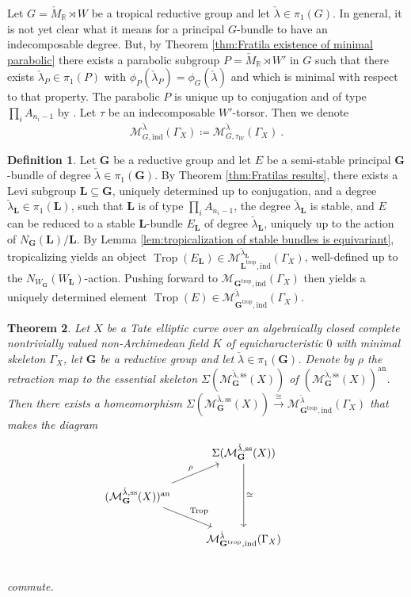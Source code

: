 \documentclass[10pt, a4paper]{amsart}
\newtheorem{theorem}{Theorem}[section]
\theoremstyle{definition}
\newtheorem{definition}[theorem]{Definition}
\theoremstyle{myitemstyle}
\newcommand{\R}{\mathbb{R}}
\newcommand{\Mcheck}{{\check{M}}}
\newcommand{\lambdacheck}{\check{\lambda}}
\newcommand{\bfG}{\mathbf{G}}
\newcommand{\mc}[1]{{\mathcal{#1}}}
\DeclareMathOperator{\Trop}{Trop}
\newcommand{\an}{\mathrm{an}}
\newcommand{\semist}{\mathrm{ss}}
\newcommand{\ind}{\mathrm{ind}}
\newcommand{\trop}{{\mathrm{trop}}}
\newcommand{\Ga}{\Gamma}
\begin{document}
Let $G= \Mcheck_\R \rtimes W$ be a tropical reductive group and let $\lambdacheck \in \pi_1(G)$. In general, it is not yet clear what it means for a principal $G$-bundle to have an indecomposable degree. But, by Theorem \ref{thm:Fratila existence of minimal parabolic} there exists a parabolic subgroup $P=\Mcheck_\R \rtimes W'$ in $G$ such that there exists $\lambdacheck_P\in \pi_1(P)$ with $\phi_P(\lambdacheck_P)=\phi_G(\lambdacheck)$ and which is minimal with respect to that property. The parabolic $P$ is unique up to conjugation and of type $\prod_i A_{n_i-1}$ by \cite[Cor. 4.2]{fratila2016stack}. Let $\tau$ be an indecomposable $W'$-torsor. Then we denote 
\[
    \mc M_{G,\ind}^{\lambdacheck}(\Ga_X)\coloneqq\mc M_{G,\tau_W}^{ \lambdacheck}(\Ga_X) \ .
\]


\begin{definition}
Let $\mathbf{G}$ be a reductive group and let $E$ be a semi-stable principal $\mathbf{G}$-bundle of degree $\lambdacheck \in \pi_1(\bfG)$. By Theorem \ref{thm:Fratilas results}, there exists a Levi subgroup $\mathbf{L} \subseteq \mathbf{G}$, uniquely determined up to conjugation, and a degree $\lambdacheck_\mathbf{L}\in \pi_1(\mathbf{L})$, such that $\mathbf{L}$ is of type $\prod_i A_{n_i-1}$, the degree $\lambdacheck_\mathbf{L}$ is stable, and $E$ can be reduced to a stable $\mathbf{L}$-bundle $E_\mathbf{L}$ of degree $\lambdacheck_\mathbf{L}$, uniquely up to the action of $N_\mathbf{G}(\mathbf{L})/\mathbf{L}$. By Lemma \ref{lem:tropicalization of stable bundles is equivariant}, tropicalizing yields an object $\Trop(E_\mathbf{L})\in \mc M_{\mathbf{L}^\trop,\ind}^{\lambdacheck_\mathbf{L}}(\Ga_X)$, well-defined up to the $N_{W_\mathbf{G}}(W_\mathbf{L})$-action. Pushing forward to $\mc M_{\mathbf{G}^\trop,\ind}(\Ga_X)$ then yields a uniquely determined element $\Trop(E)\in \mc M_{\mathbf{G}^\trop, \ind}^{\lambdacheck}(\Ga_X)$.
\end{definition}


\begin{theorem} 
\label{thm:tropical semistable bundles skeleton of semistable bundles}
Let $X$ be a Tate elliptic curve over an algebraically closed complete nontrivially valued non-Archimedean field $K$ of equicharacteristic $0$ with minimal skeleton $\Gamma_X$, let $\mathbf{G}$ be a reductive group and let $\lambdacheck\in \pi_1(\mathbf{G})$. Denote by $\rho$ the retraction map to the essential skeleton $\Sigma(\mc M_{\mathbf{G}}^{\lambdacheck,\semist}(X))$ of $(\mc M_{\mathbf{\mathbf{G}}}^{\lambdacheck,\semist}(X))^\an$. Then there exists a homeomorphism $\Sigma(\mc M_{\mathbf{G}}^{\lambdacheck,\semist}(X))\xrightarrow{\cong}\mc M_{\mathbf{G}^\trop,\ind}^{\lambdacheck}(\Ga_X)$ that makes the diagram
\[
\begin{tikzcd}
    & 
        \Sigma(\mc M_{\mathbf{G}}^{\lambdacheck,\semist}(X))\arrow[dd,"\cong"] \\
    (\mc M_{\mathbf{G}}^{\lambdacheck,\semist}(X))^\an \arrow[ur,"\rho"]\arrow[dr,"\Trop"]&
        & \\
    &
        \mc M_{\mathbf{G}^\trop,\ind}^{\lambdacheck}(\Ga_X)\\
\end{tikzcd}
\]
commute.
\end{theorem}
\end{document}
